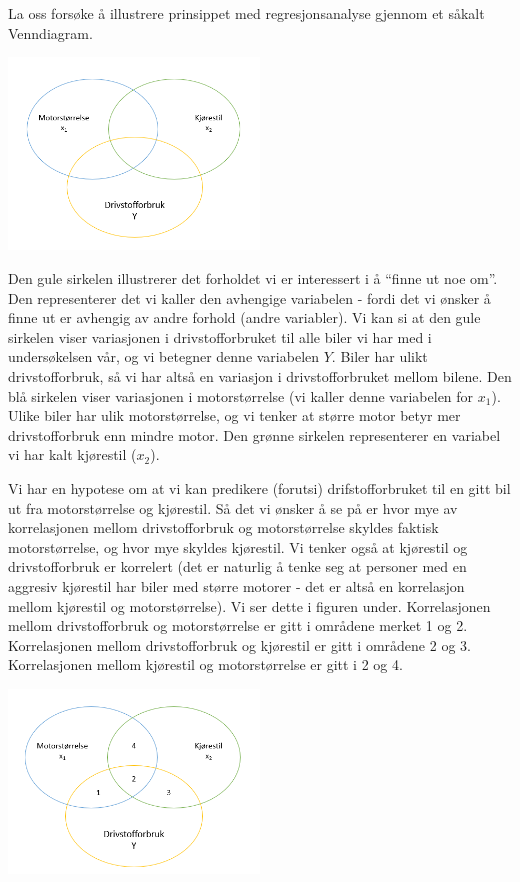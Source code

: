 \documentclass[
]{article}
\begin{document}
La oss forsøke å illustrere prinsippet med regresjonsanalyse gjennom et såkalt Venndiagram.

\includegraphics[width=0.5\textwidth,height=\textheight]{Venn1.png}

Den gule sirkelen illustrerer det forholdet vi er interessert i å ``finne ut noe om''. Den representerer det vi kaller den avhengige variabelen - fordi det vi ønsker å finne ut er avhengig av andre forhold (andre variabler). Vi kan si at den gule sirkelen viser variasjonen i drivstofforbruket til alle biler vi har med i undersøkelsen vår, og vi betegner denne variabelen \(Y\). Biler har ulikt drivstofforbruk, så vi har altså en variasjon i drivstofforbruket mellom bilene. Den blå sirkelen viser variasjonen i motorstørrelse (vi kaller denne variabelen for \(x_1\)). Ulike biler har ulik motorstørrelse, og vi tenker at større motor betyr mer drivstofforbruk enn mindre motor. Den grønne sirkelen representerer en variabel vi har kalt kjørestil (\(x_2\)).

Vi har en hypotese om at vi kan predikere (forutsi) drifstofforbruket til en gitt bil ut fra motorstørrelse og kjørestil. Så det vi ønsker å se på er hvor mye av korrelasjonen mellom drivstofforbruk og motorstørrelse skyldes faktisk motorstørrelse, og hvor mye skyldes kjørestil. Vi tenker også at kjørestil og drivstofforbruk er korrelert (det er naturlig å tenke seg at personer med en aggresiv kjørestil har biler med større motorer - det er altså en korrelasjon mellom kjørestil og motorstørrelse). Vi ser dette i figuren under. Korrelasjonen mellom drivstofforbruk og motorstørrelse er gitt i områdene merket 1 og 2. Korrelasjonen mellom drivstofforbruk og kjørestil er gitt i områdene 2 og 3. Korrelasjonen mellom kjørestil og motorstørrelse er gitt i 2 og 4.

\includegraphics[width=0.5\textwidth,height=\textheight]{Venn2.png}
\end{document}
